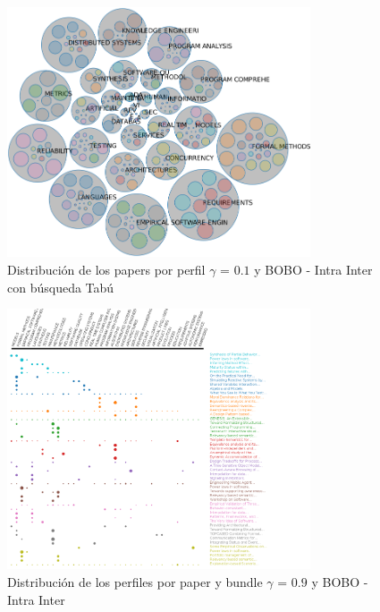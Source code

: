 \begin{figure}[H]
  \centering
    \includegraphics[width=0.8\textwidth]{resultados/papers/BOBO/INTRA_INTER/bubbles-gamma-with-local-01.png}
  \caption{Distribución de los papers por perfil $\gamma$ = $0.1$ y BOBO - Intra Inter con búsqueda Tabú}
  \label{res:img-papers-bubbles-gamma01-hac-intra-inter-bobo}
\end{figure}

\begin{figure}[H]
  \centering
    \includegraphics[width=0.8\textwidth]{resultados/papers/BOBO/INTRA_INTER/gamma-09.png}
  \caption{Distribución de los perfiles por paper y bundle $\gamma$ = $0.9$ y BOBO - Intra Inter}
  \label{res:img-papers-gamma09-bobo-intra-inter}
\end{figure}


